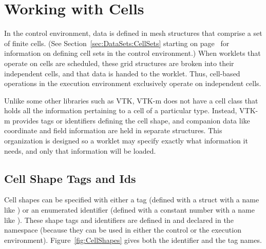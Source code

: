 
\chapter{Working with Cells}
\label{chap:WorkingWithCells}


In the control environment, data is defined in mesh structures that
comprise a set of finite cells. (See Section~\ref{sec:DataSets:CellSets}
starting on page~\pageref{sec:DataSets:CellSets} for information on
defining cell sets in the control environment.) When worklets that operate
on cells are scheduled, these grid structures are broken into their
independent cells, and that data is handed to the worklet. Thus, cell-based
operations in the execution environment exclusively operate on independent
cells.

Unlike some other libraries such as VTK, VTK-m does not have a cell class
that holds all the information pertaining to a cell of a particular type.
Instead, VTK-m provides tags or identifiers defining the cell shape, and
companion data like coordinate and field information are held in separate
structures. This organization is designed so a worklet may specify exactly
what information it needs, and only that information will be loaded.

\section{Cell Shape Tags and Ids}
\label{sec:CellShapeTagsIds}


Cell shapes can be specified with either a tag (defined with a struct with
a name like ) or an enumerated identifier
(defined with a constant number with a name like
). These shape tags and identifiers are
defined in  and declared in the \vtkm{}
namespace (because they can be used in either the control or the execution
environment). Figure~\ref{fig:CellShapes} gives both the identifier and the
tag names.

